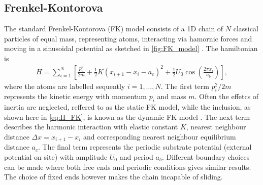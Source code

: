 



\subsection{Frenkel-Kontorova}

The standard Frenkel-Kontorova (FK) model consists of a 1D chain of $N$ classical
particles of equal mass, representing atoms, interacting via hamornic forces and moving in a sinusoidal potential as sketched in \cref{fig:FK_model} \cite{Manini_2016}. The hamiltonian is 
\begin{align}
  H = \sum_{i=1}^N \left[\frac{p_i^2}{2m} + \frac{1}{2}K(x_{i+1} - x_i - a_c)^2 + \frac{1}{2}U_0 \cos{\left(\frac{2\pi x_i}{a_b}\right)}\right],
  \label{eq:H_FK}
\end{align}
where the atoms are labelled sequently $i = 1, \hdots, N$. The first term $p_i^2/2m$ represents the kinetic energy with momentum $p_i$
and mass $m$. Often the effetcs of inertia are neglected, reffered to as the static FK model, while the inclusion, as shown here in \cref{eq:H_FK}, is known as the dynamic FK model \cite{FK2D}. The next term describes the harmonic interaction with elastic
constant $K$, nearest neighbour distance $\Delta x = x_{i+1} - x_i$ and 
corresponding nearest neighbour equilibrium distance $a_c$. The final term represents the periodic substrate potential (external potential on site) with amplitude $U_0$ and period $a_b$. Different boundary choices can be made where both free ends and periodic conditions gives similar results. The choice of fixed ends however makes the chain incapable of sliding.

